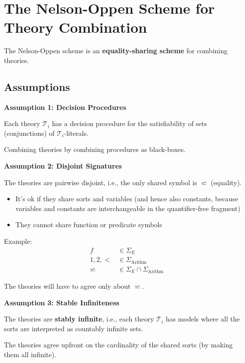 \documentclass[11pt,a4paper]{article}
\theoremstyle{definition}
\theoremstyle{plain}
\theoremstyle{remark}
\begin{document}
\section{The Nelson-Oppen Scheme for Theory Combination}

The Nelson-Oppen scheme is an \textbf{equality-sharing scheme} for combining theories.

\subsection{Assumptions}

\begin{tcolorbox}[colback=blue!5!white,colframe=blue!75!black,title=\textbf{Nelson-Oppen Assumptions}]
\textbf{Assumption 1: Decision Procedures}

Each theory $\mathcal{T}_i$ has a decision procedure for the satisfiability of sets (conjunctions) of $\mathcal{T}_i$-literals.

Combining theories by combining procedures as black-boxes.

\vspace{0.5em}

\textbf{Assumption 2: Disjoint Signatures}

The theories are pairwise disjoint, i.e., the only shared symbol is $\backsimeq$ (equality).

\begin{itemize}
    \item It's ok if they share sorts and variables (and hence also constants, because variables and constants are interchangeable in the quantifier-free fragment)
    \item They cannot share function or predicate symbols
\end{itemize}

Example:
\begin{align*}
f &\in \Sigma_E \\
1, 2, < &\in \Sigma_{\text{Arithm}} \\
\backsimeq &\in \Sigma_E \cap \Sigma_{\text{Arithm}}
\end{align*}

The theories will have to agree only about $\backsimeq$.

\vspace{0.5em}

\textbf{Assumption 3: Stable Infiniteness}

The theories are \textbf{stably infinite}, i.e., each theory $\mathcal{T}_i$ has models where all the sorts are interpreted as countably infinite sets.

The theories agree upfront on the cardinality of the shared sorts (by making them all infinite).
\end{tcolorbox}
\end{document}
